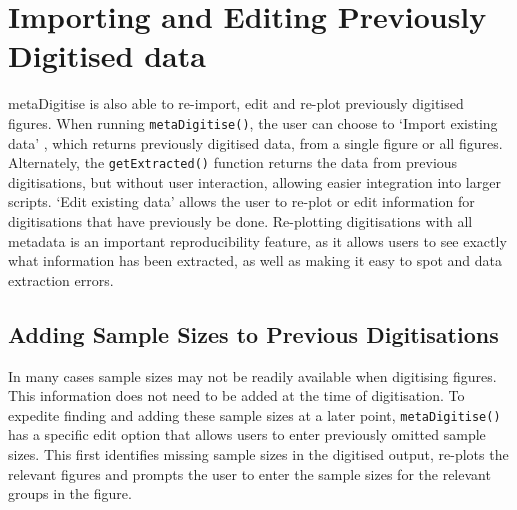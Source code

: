 \documentclass[12pt]{article}
\newcommand{\fct}[1]{\texttt{#1()}}
\newcommand{\pkg}[1]{{\fontseries{b}\selectfont #1}}
\begin{document}


\section{Importing and Editing Previously Digitised data}
\pkg{metaDigitise} is also able to re-import, edit and re-plot previously digitised figures. When running \fct{metaDigitise}, the user can choose to `Import existing data' , which returns previously digitised data, from a single figure or all figures. Alternately, the \fct{getExtracted} function returns the data from previous digitisations, but without user interaction, allowing easier integration into larger scripts. `Edit existing data' allows the user to re-plot or edit information for digitisations that have previously be done. Re-plotting digitisations with all metadata is an important reproducibility feature, as it allows users to see exactly what information has been extracted, as well as making it easy to spot and data extraction errors.

\subsection{Adding Sample Sizes to Previous Digitisations}
In many cases sample sizes may not be readily available when digitising figures. This information does not need to be added at the time of digitisation. To expedite finding and adding these sample sizes at a later point, \fct{metaDigitise} has a specific edit option that allows users to enter previously omitted sample sizes. This first identifies missing sample sizes in the digitised output, re-plots the relevant figures and prompts the user to enter the sample sizes for the relevant groups in the figure. 




\end{document}
